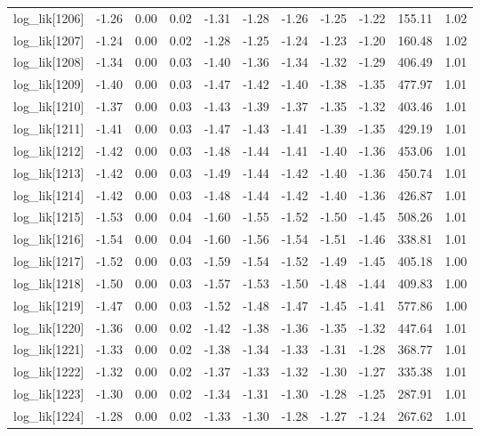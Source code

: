 \begin{table}[ht]
\begin{tabular}{rrrrrrrrrrr}
  log\_lik[1206] & -1.26 & 0.00 & 0.02 & -1.31 & -1.28 & -1.26 & -1.25 & -1.22 & 155.11 & 1.02 \\ 
  log\_lik[1207] & -1.24 & 0.00 & 0.02 & -1.28 & -1.25 & -1.24 & -1.23 & -1.20 & 160.48 & 1.02 \\ 
  log\_lik[1208] & -1.34 & 0.00 & 0.03 & -1.40 & -1.36 & -1.34 & -1.32 & -1.29 & 406.49 & 1.01 \\ 
  log\_lik[1209] & -1.40 & 0.00 & 0.03 & -1.47 & -1.42 & -1.40 & -1.38 & -1.35 & 477.97 & 1.01 \\ 
  log\_lik[1210] & -1.37 & 0.00 & 0.03 & -1.43 & -1.39 & -1.37 & -1.35 & -1.32 & 403.46 & 1.01 \\ 
  log\_lik[1211] & -1.41 & 0.00 & 0.03 & -1.47 & -1.43 & -1.41 & -1.39 & -1.35 & 429.19 & 1.01 \\ 
  log\_lik[1212] & -1.42 & 0.00 & 0.03 & -1.48 & -1.44 & -1.41 & -1.40 & -1.36 & 453.06 & 1.01 \\ 
  log\_lik[1213] & -1.42 & 0.00 & 0.03 & -1.49 & -1.44 & -1.42 & -1.40 & -1.36 & 450.74 & 1.01 \\ 
  log\_lik[1214] & -1.42 & 0.00 & 0.03 & -1.48 & -1.44 & -1.42 & -1.40 & -1.36 & 426.87 & 1.01 \\ 
  log\_lik[1215] & -1.53 & 0.00 & 0.04 & -1.60 & -1.55 & -1.52 & -1.50 & -1.45 & 508.26 & 1.01 \\ 
  log\_lik[1216] & -1.54 & 0.00 & 0.04 & -1.60 & -1.56 & -1.54 & -1.51 & -1.46 & 338.81 & 1.01 \\ 
  log\_lik[1217] & -1.52 & 0.00 & 0.03 & -1.59 & -1.54 & -1.52 & -1.49 & -1.45 & 405.18 & 1.00 \\ 
  log\_lik[1218] & -1.50 & 0.00 & 0.03 & -1.57 & -1.53 & -1.50 & -1.48 & -1.44 & 409.83 & 1.00 \\ 
  log\_lik[1219] & -1.47 & 0.00 & 0.03 & -1.52 & -1.48 & -1.47 & -1.45 & -1.41 & 577.86 & 1.00 \\ 
  log\_lik[1220] & -1.36 & 0.00 & 0.02 & -1.42 & -1.38 & -1.36 & -1.35 & -1.32 & 447.64 & 1.01 \\ 
  log\_lik[1221] & -1.33 & 0.00 & 0.02 & -1.38 & -1.34 & -1.33 & -1.31 & -1.28 & 368.77 & 1.01 \\ 
  log\_lik[1222] & -1.32 & 0.00 & 0.02 & -1.37 & -1.33 & -1.32 & -1.30 & -1.27 & 335.38 & 1.01 \\ 
  log\_lik[1223] & -1.30 & 0.00 & 0.02 & -1.34 & -1.31 & -1.30 & -1.28 & -1.25 & 287.91 & 1.01 \\ 
  log\_lik[1224] & -1.28 & 0.00 & 0.02 & -1.33 & -1.30 & -1.28 & -1.27 & -1.24 & 267.62 & 1.01 \\ 

\end{tabular}
\end{table}
